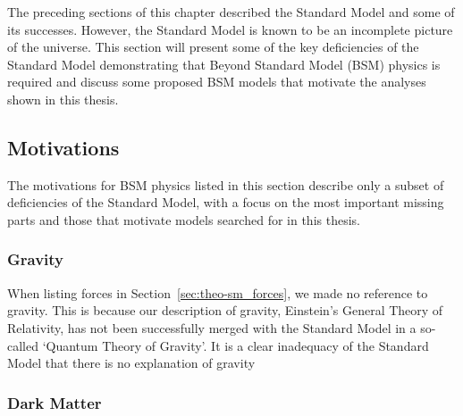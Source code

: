 The preceding sections of this chapter described the Standard Model and some of its successes.
However, the Standard Model is known to be an incomplete picture of the universe.
This section will present some of the key deficiencies of the Standard Model demonstrating that Beyond Standard Model (BSM) physics is required
and discuss some proposed BSM models that motivate the analyses shown in this thesis.

\subsection{Motivations}

The motivations for BSM physics listed in this section
describe only a subset of deficiencies of the Standard Model,
with a focus on the most important missing parts and
those that motivate models searched for in this thesis.

\subsubsection{Gravity}

When listing forces in Section~\ref{sec:theo-sm_forces}, we made no reference to gravity.
This is because our description of gravity, Einstein's General Theory of Relativity,
has not been successfully merged with the Standard Model in a so-called `Quantum Theory of Gravity'.
It is a clear inadequacy of the Standard Model that there is no explanation of gravity

\subsubsection{Dark Matter}
\label{sec:theo_bsm_dm}


